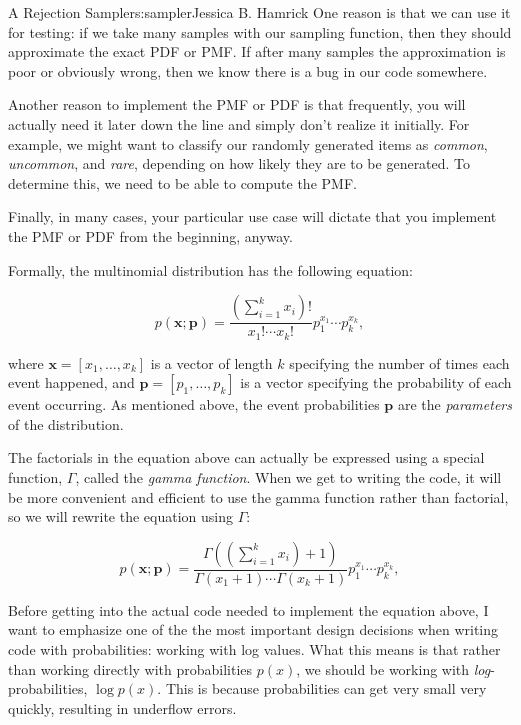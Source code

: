 \begin{aosachapter}{A Rejection Sampler}{s:sampler}{Jessica B. Hamrick}
One reason is that we can use it for testing: if we take many samples
with our sampling function, then they should approximate the exact PDF
or PMF. If after many samples the approximation is poor or obviously
wrong, then we know there is a bug in our code somewhere.

Another reason to implement the PMF or PDF is that frequently, you will
actually need it later down the line and simply don't realize it
initially. For example, we might want to classify our randomly generated
items as \emph{common}, \emph{uncommon}, and \emph{rare}, depending on
how likely they are to be generated. To determine this, we need to be
able to compute the PMF.

Finally, in many cases, your particular use case will dictate that you
implement the PMF or PDF from the beginning, anyway.

\label{the-multinomial-pmf-equation}

Formally, the multinomial distribution has the following equation:

\[
p(\mathbf{x}; \mathbf{p}) = \frac{(\sum_{i=1}^k x_i)!}{x_1!\cdots{}x_k!}p_1^{x_1}\cdots{}p_k^{x_k},
\]

where $\mathbf{x}=[x_1, \ldots{}, x_k]$ is a vector of length $k$
specifying the number of times each event happened, and
$\mathbf{p}=[p_1, \ldots{}, p_k]$ is a vector specifying the probability
of each event occurring. As mentioned above, the event probabilities
$\mathbf{p}$ are the \emph{parameters} of the distribution.

The factorials in the equation above can actually be expressed using a
special function, $\Gamma$, called the \emph{gamma function}. When we
get to writing the code, it will be more convenient and efficient to use
the gamma function rather than factorial, so we will rewrite the
equation using $\Gamma$:

\[
p(\mathbf{x}; \mathbf{p}) = \frac{\Gamma((\sum_{i=1}^k x_i)+1)}{\Gamma(x_1+1)\cdots{}\Gamma(x_k+1)}p_1^{x_1}\cdots{}p_k^{x_k},
\]

\label{working-with-log-values}

Before getting into the actual code needed to implement the equation
above, I want to emphasize one of the the most important design
decisions when writing code with probabilities: working with log values.
What this means is that rather than working directly with probabilities
$p(x)$, we should be working with \emph{log}-probabilities,
$\log{p(x)}$. This is because probabilities can get very small very
quickly, resulting in underflow errors.


\end{aosachapter}
